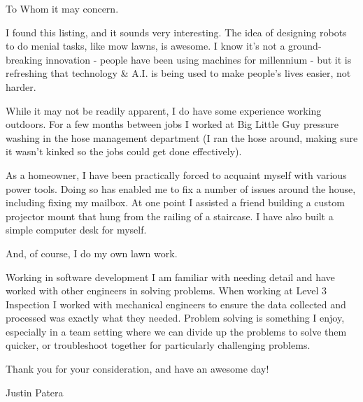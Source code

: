 
To Whom it may concern.

\smallskip

I found this listing, and it sounds very interesting.
The idea of designing robots to do menial tasks, like mow lawns, is awesome.
I know it's not a ground-breaking innovation - people have been using machines for millennium - but it is refreshing that technology \& A.I. is being used to make people's lives easier, not harder.

\smallskip

While it may not be readily apparent, I do have some experience working outdoors.
For a few months between jobs I worked at Big Little Guy pressure washing in the hose management department (I ran the hose around, making sure it wasn't kinked so the jobs could get done effectively).

\smallskip

As a homeowner, I have been practically forced to acquaint myself with various power tools.
Doing so has enabled me to fix a number of issues around the house, including fixing my mailbox.
At one point I assisted a friend building a custom projector mount that hung from the railing of a staircase.
I have also built a simple computer desk for myself.

\smallskip

And, of course, I do my own lawn work.

\smallskip

Working in software development I am familiar with needing detail and have worked with other engineers in solving problems.
When working at Level 3 Inspection I worked with mechanical engineers to ensure the data collected and processed was exactly what they needed.
Problem solving is something I enjoy, especially in a team setting where we can divide up the problems to solve them quicker, or troubleshoot together for particularly challenging problems.

\smallskip

Thank you for your consideration, and have an awesome day!

\smallskip

Justin Patera

